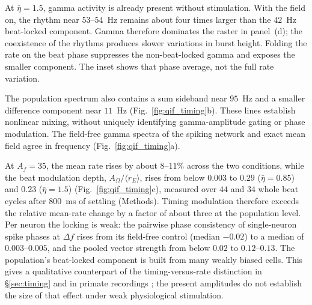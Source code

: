 \documentclass[11pt,a4paper]{article}
\begin{document}
At $\bar\eta=1.5$, gamma activity is already present without stimulation. With the
field on, the rhythm near $53$--$54$~Hz remains about four times larger than the
$42$~Hz beat-locked component. Gamma therefore dominates the raster in panel~(d);
the coexistence of the rhythms produces slower variations in burst height. Folding the
rate on the beat phase suppresses the non-beat-locked gamma and exposes the smaller
component. The inset shows that phase average, not the full rate variation.

The population spectrum also contains a sum sideband near $95$~Hz and a smaller
difference component near $11$~Hz (Fig.~\ref{fig:qif_timing}b). These lines establish
nonlinear mixing, without uniquely identifying gamma-amplitude gating or phase
modulation. The field-free gamma spectra of the spiking network and exact mean field
agree in frequency (Fig.~\ref{fig:qif_timing}a).

At $A_f=35$, the mean rate rises by about $8$--$11\%$ across the two conditions, while the beat modulation
depth, $A_\Omega/\langle r_E\rangle$, rises from below $0.003$ to $0.29$
($\bar\eta=0.85$) and $0.23$ ($\bar\eta=1.5$) (Fig.~\ref{fig:qif_timing}c), measured over $44$ and $34$ whole beat
cycles after $800$~ms of settling (Methods). Timing modulation therefore exceeds the
relative mean-rate change by a factor of about three at the population level. Per neuron
the locking is weak: the pairwise phase consistency of single-neuron spike phases at
$\Delta f$ rises from its field-free control (median $-0.02$) to a median of
$0.003$--$0.005$, and the pooled vector strength from below $0.02$ to $0.12$--$0.13$. The
population's beat-locked component is built from many weakly biased cells. This gives a
qualitative counterpart of the timing-versus-rate distinction in \S\ref{sec:timing}
and in primate recordings \cite{vieira2024}; the present amplitudes do not establish
the size of that effect under weak physiological stimulation.
\end{document}
